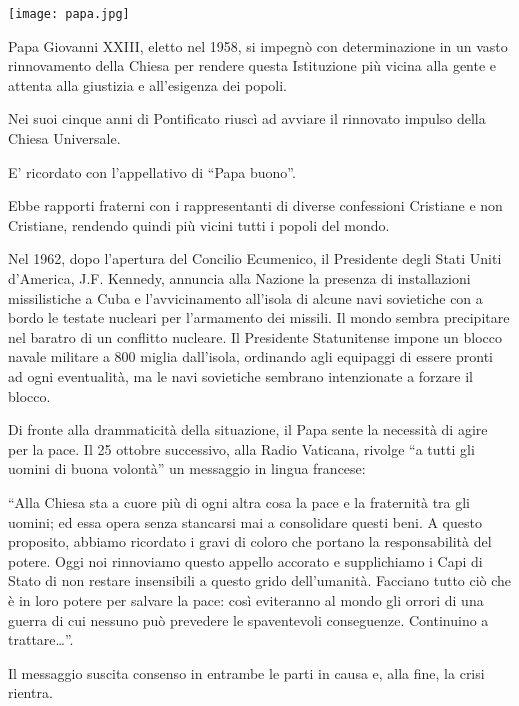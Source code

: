 \texttt{[image: papa.jpg]}

Papa Giovanni XXIII, eletto nel 1958, si impegnò con determinazione in un vasto rinnovamento della Chiesa per rendere questa Istituzione più vicina alla gente e attenta alla giustizia e all’esigenza dei popoli.

Nei suoi cinque anni di Pontificato riuscì ad avviare il rinnovato impulso della Chiesa Universale.

E’ ricordato con l’appellativo di “Papa buono”.

Ebbe rapporti fraterni con i rappresentanti di diverse confessioni Cristiane e non Cristiane, rendendo  quindi più vicini tutti i popoli del mondo.

Nel 1962, dopo l’apertura del Concilio Ecumenico, il Presidente degli Stati Uniti d’America, J.F. Kennedy, annuncia alla Nazione la presenza di installazioni missilistiche a Cuba e l’avvicinamento all’isola di alcune navi sovietiche con a bordo le testate nucleari per l’armamento dei missili. Il mondo sembra precipitare nel baratro di un conflitto nucleare. Il Presidente Statunitense impone un blocco navale militare a 800 miglia dall’isola, ordinando agli equipaggi di essere pronti ad ogni eventualità, ma le navi sovietiche sembrano intenzionate a forzare il blocco.

Di fronte alla drammaticità della situazione, il Papa sente la necessità di agire per la pace. Il 25 ottobre successivo, alla Radio Vaticana, rivolge “a tutti gli uomini di buona volontà” un messaggio in lingua francese:

“Alla Chiesa sta a cuore più di ogni altra cosa la pace e la fraternità tra gli uomini; ed essa opera senza stancarsi mai a consolidare questi beni.  A questo proposito, abbiamo ricordato i gravi di coloro che portano la responsabilità del potere. Oggi noi rinnoviamo questo appello accorato e supplichiamo i Capi di Stato di non restare insensibili a questo grido dell’umanità. Facciano tutto ciò che è in loro potere per salvare la pace: così eviteranno al mondo gli orrori di una guerra di cui nessuno può prevedere le spaventevoli conseguenze.
Continuino a trattare…”.

Il messaggio suscita consenso in entrambe le parti in causa e, alla fine, la crisi rientra.
